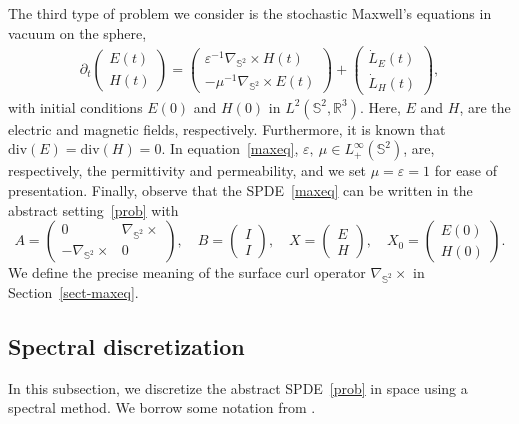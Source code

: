 \documentclass[11pt]{amsart}
\newcommand{\R}{{\mathbb R}}
\newcommand{\IS}{\mathbb{S}}
\newcommand{\nablalb}{\nabla_{\IS^{2}}}
\begin{document}
The third type of problem we consider is the stochastic Maxwell's equations in vacuum on the sphere,
\begin{align}\label{maxeq}
\partial_t \begin{pmatrix}
        E(t) \\ H(t)
    \end{pmatrix} = \begin{pmatrix}
        \varepsilon^{-1}\nablalb \times H(t) \\ -\mu^{-1}\nablalb \times E(t)
    \end{pmatrix} + \begin{pmatrix} \dot{L}_E(t) \\ \dot{L}_H(t) \end{pmatrix},
\end{align}
with initial conditions $E(0)$ and $H(0)$ in $L^2(\IS^2,\R^3)$. Here,
$E$ and $H$, are the electric and magnetic fields, respectively. Furthermore, it is known that $\text{div}(E)=\text{div}(H)=0$.
In equation~\eqref{maxeq}, $\varepsilon,\ \mu\in L^\infty_{+}(\IS^2)$, are, respectively, the permittivity and permeability,
and we set $\mu=\varepsilon=1$ for ease of presentation. Finally, observe that the SPDE~\eqref{maxeq} can be written in the abstract setting~\eqref{prob}
with
\begin{equation*}
 A=\begin{pmatrix} 0 & \nablalb\times \\ -\nablalb\times & 0 \end{pmatrix},
 \quad B=\begin{pmatrix} I\\ I \end{pmatrix},
 \quad X=\begin{pmatrix} E\\ H\end{pmatrix}, \quad X_0=\begin{pmatrix} E(0)\\ H(0)\end{pmatrix}.
\end{equation*}
We define the precise meaning of the surface curl operator $\nabla_{\IS^{2}}\times$ in Section~\ref{sect-maxeq}.

\subsection{Spectral discretization}
\label{subsec:spectral}
In this subsection, we discretize the abstract SPDE~\eqref{prob} in space using a spectral method.
We borrow some notation from \cite{MR4462619,papi2025}.
\end{document}

